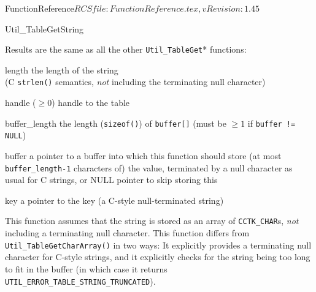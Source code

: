 \begin{cactuspart}{5}{FunctionReference}{$RCSfile: FunctionReference.tex,v $}{$Revision: 1.45 $}
\begin{FunctionDescription}{Util\_TableGetString}
\begin{ResultNote}
Results are the same as all the other \verb|Util_TableGet|* functions:
\end{ResultNote}
\begin{Result}{length}
the length of the string\\
(C \verb|strlen()| semantics, \ie{} {\em not\/} including
the terminating null character)
\end{Result}

\begin{Parameter}{handle ($\ge 0$)}
handle to the table
\end{Parameter}
\begin{Parameter}{buffer\_length}
the length (\verb|sizeof()|) of \verb|buffer[]|
(must be $\ge 1$ if \verb|buffer != NULL|)
\end{Parameter}
\begin{Parameter}{buffer}
a pointer to a buffer into which this function should store
(at most \verb|buffer_length-1|  characters of) the value,
terminated by a null character as usual for C strings,
or NULL pointer to skip storing this
\end{Parameter}
\begin{Parameter}{key}
a pointer to the key (a C-style null-terminated string)
\end{Parameter}

\begin{Discussion}
This function assumes that the string is stored as an array of
\verb|CCTK_CHAR|s, {\em not\/} including a terminating null character.
\NewPar
This function differs from \verb|Util_TableGetCharArray()| in two ways:
It explicitly provides a terminating null character for C-style strings,
and it explicitly checks for the string being too long to fit in the buffer
(in which case it returns \verb|UTIL_ERROR_TABLE_STRING_TRUNCATED|).
\end{Discussion}


\end{FunctionDescription}
\end{cactuspart}
